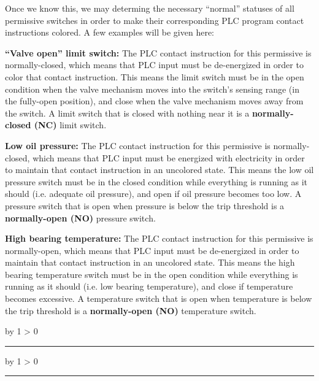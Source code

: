 \documentclass[12pt,a4paper]{article}
\def\oppgave{
            \advance\questnum by 1
            \ifnum \questnum > 0
                 \hrule
                 \vskip 3pt
                 \leftline{Oppgave \the\questnum}
                 \vskip 3pt \fi}
\def\notes{
           \advance\explnum by 1
           \ifnum \explnum > 0
                \hrule
                \vskip 3pt
                \leftline{Notes \the\explnum}
                \vskip 3pt \fi}
\begin{document}
Once we know this, we may determing the necessary ``normal'' statuses of all permissive switches in order to make their corresponding PLC program contact instructions colored.  A few examples will be given here:

\vskip 10pt

\noindent
{\bf ``Valve open'' limit switch:} The PLC contact instruction for this permissive is normally-closed, which means that PLC input must be de-energized in order to color that contact instruction.  This means the limit switch must be in the open condition when the valve mechanism moves into the switch's sensing range (in the fully-open position), and close when the valve mechanism moves away from the switch.  A limit switch that is closed with nothing near it is a {\bf normally-closed (NC)} limit switch.
\vskip 10pt

\noindent
{\bf Low oil pressure:} The PLC contact instruction for this permissive is normally-closed, which means that PLC input must be energized with electricity in order to maintain that contact instruction in an uncolored state.  This means the low oil pressure switch must be in the closed condition while everything is running as it should (i.e. adequate oil pressure), and open if oil pressure becomes too low.  A pressure switch that is open when pressure is below the trip threshold is a {\bf normally-open (NO)} pressure switch.

\vskip 10pt

\noindent
{\bf High bearing temperature:} The PLC contact instruction for this permissive is normally-open, which means that PLC input must be de-energized in order to maintain that contact instruction in an uncolored state.  This means the high bearing temperature switch must be in the open condition while everything is running as it should (i.e. low bearing temperature), and close if temperature becomes excessive.  A temperature switch that is open when temperature is below the trip threshold is a {\bf normally-open (NO)} temperature switch.

\vskip 10pt

\vskip 10pt \filbreak 





\notes{} 



\vfil \eject 



\oppgave{} 
\end{document}
